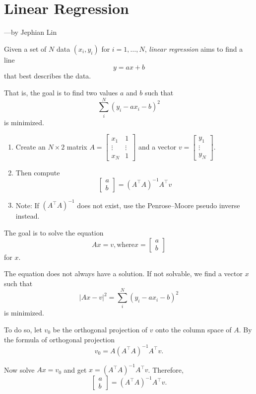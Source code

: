 \documentclass[SageableMath-2019SMath316.tex]{subfiles}
\begin{document}
\section{Linear Regression}
\begin{flushright}
---by Jephian Lin
\end{flushright}

Given a set of $N$ data $(x_i,y_i)$ for $i=1,\ldots,N$,
\emph{linear regression} aims to find a line 
\[ y=ax+b \]
that best describes the data.  

That is, the goal is  
to find two values $a$ and $b$ such that  
\[ \sum_i^N (y_i - ax_i - b)^2 \]
is minimized.

\begin{enumerate}
\item Create an $N\times 2$ matrix $A=\begin{bmatrix}x_1 & 1 \\ \vdots & \vdots \\ x_N & 1 \end{bmatrix}$ and a vector $v=\begin{bmatrix}y_1 \\ \vdots \\ y_N \end{bmatrix}$.
\item Then compute 
\[ \begin{bmatrix} a \\ b \end{bmatrix} = (A^\top A)^{-1} A^\top v \]
\item[] Note: If $(A^\top A)^{-1}$ does not exist, use the Penrose--Moore pseudo inverse instead.
\end{enumerate}

The goal is to solve the equation 
\[ Ax = v, \text{where} x = \begin{bmatrix} a \\ b \end{bmatrix} \]
for $x$.  

The equation does not always have a solution.  
If not solvable, we find a vector $x$ such that 
\[ |Ax-v|^2 = \sum_i^N (y_i - ax_i - b)^2 \]
is minimized.  

To do so, let $v_0$ be the orthogonal projection of $v$ onto the column space of $A$.  
By the formula of orthogonal projection 
\[ v_0 = A(A^\top A)^{-1}A^\top v. \]

Now solve $Ax=v_0$ and get $x=(A^\top A)^{-1}A^\top v$.  
Therefore,  
\[ \begin{bmatrix} a \\ b \end{bmatrix} = (A^\top A)^{-1}A^\top v. \]
\end{document}
